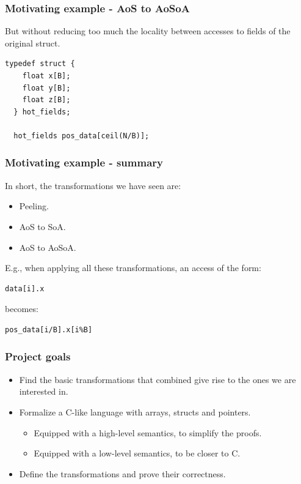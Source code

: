 \begin{frame}[fragile]
\frametitle{Motivating example - AoS to AoSoA}

But without reducing too much the locality between accesses to fields of the original struct.

\bigskip

\begin{lstlisting}[style=Cstyle]
  typedef struct {
    float x[B];
    float y[B];
    float z[B];
  } hot_fields;

  hot_fields pos_data[ceil(N/B)];
\end{lstlisting}

\end{frame}


\begin{frame}[fragile]
\frametitle{Motivating example - summary}

In short, the transformations we have seen are:
\begin{itemize}
	\item Peeling.
	\item AoS to SoA.
	\item AoS to AoSoA.
\end{itemize}

\bigskip \pause

E.g., when applying all these transformations, an access of the form:

\begin{lstlisting}[style=Cstyle]
  data[i].x
\end{lstlisting}

becomes:

\begin{lstlisting}[style=Cstyle]
  pos_data[i/B].x[i%B]
\end{lstlisting}

\end{frame}


\begin{frame}[fragile]
\frametitle{Project goals}

\begin{itemize}
	\setlength\itemsep{1.5em}
	\item Find the basic transformations that combined give rise to the ones we are interested in.\\ \pause
	\item Formalize a C-like language with arrays, structs and pointers.
	\begin{itemize}
		\item Equipped with a high-level semantics, to simplify the proofs.
		\item Equipped with a low-level semantics, to be closer to C.
	\end{itemize} \pause
	\item Define the transformations and prove their correctness.
\end{itemize}

\end{frame}


